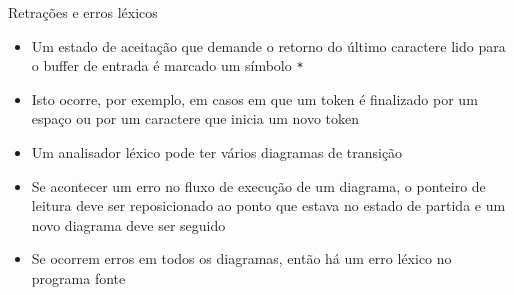 \begin{frame}[fragile]{Retrações e erros léxicos}

    \begin{itemize}
        \item Um estado de aceitação que demande o retorno do último caractere lido para o buffer de entrada é marcado um símbolo \texttt{*}

        \item Isto ocorre, por exemplo, em casos em que um token é finalizado por um espaço ou por um caractere que inicia um novo token

        \item Um analisador léxico pode ter vários diagramas de transição

        \item Se acontecer um erro no fluxo de execução de um diagrama, o ponteiro de leitura deve ser reposicionado ao ponto que estava no estado de partida
            e um novo diagrama deve ser seguido

        \item Se ocorrem erros em todos os diagramas, então há um erro léxico no programa fonte 
    \end{itemize}

\end{frame}


